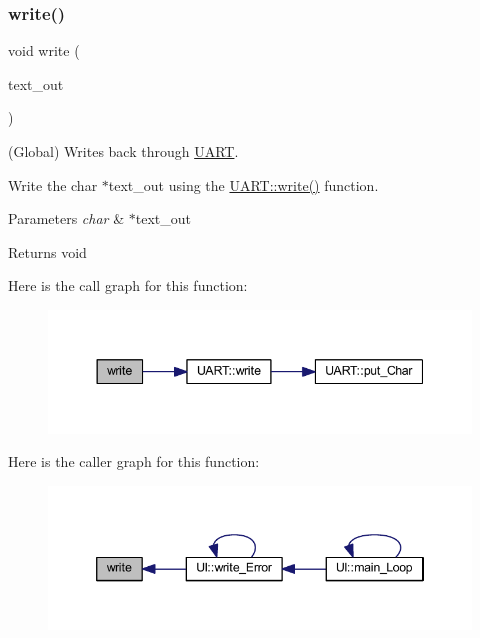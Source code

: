 \subsubsection{\texorpdfstring{write()}{write()}}
{\footnotesize\ttfamily void write (\begin{DoxyParamCaption}\item[{char $\ast$}]{text\+\_\+out }\end{DoxyParamCaption})}



(Global) Writes back through \mbox{\hyperlink{namespace_u_a_r_t}{U\+A\+RT}}. 

Write the char $\ast$text\+\_\+out using the \mbox{\hyperlink{namespace_u_a_r_t_a20b32a5769a95ed363726431c01702e9}{U\+A\+R\+T\+::write()}} function.


\begin{DoxyParams}{Parameters}
{\em char} & $\ast$text\+\_\+out \\
\hline
\end{DoxyParams}
\begin{DoxyReturn}{Returns}
void 
\end{DoxyReturn}
Here is the call graph for this function\+:\nopagebreak
\begin{figure}[H]
\begin{center}
\leavevmode
\includegraphics[width=344pt]{namespace_i_o_a20b32a5769a95ed363726431c01702e9_cgraph}
\end{center}
\end{figure}
Here is the caller graph for this function\+:\nopagebreak
\begin{figure}[H]
\begin{center}
\leavevmode
\includegraphics[width=346pt]{namespace_i_o_a20b32a5769a95ed363726431c01702e9_icgraph}
\end{center}
\end{figure}
